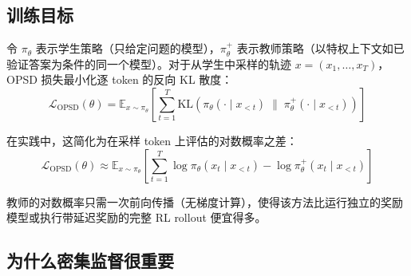 \subsection{训练目标}
\label{subsec:opsd-objective}

令 $\pi_\theta$ 表示学生策略（只给定问题的模型），$\pi_\theta^+$ 表示教师策略（以特权上下文如已验证答案为条件的同一个模型）。对于从学生中采样的轨迹 $x = (x_1, \ldots, x_T)$，OPSD 损失最小化逐 token 的反向 KL 散度：
\[
\mathcal{L}_{\text{OPSD}}(\theta) = \mathbb{E}_{x \sim \pi_\theta}\left[\sum_{t=1}^{T} \text{KL}\!\left(\pi_\theta(\cdot \mid x_{<t}) \;\|\; \pi_\theta^+(\cdot \mid x_{<t})\right)\right]
\]

在实践中，这简化为在采样 token 上评估的对数概率之差：
\[
\mathcal{L}_{\text{OPSD}}(\theta) \approx \mathbb{E}_{x \sim \pi_\theta}\left[\sum_{t=1}^{T} \log \pi_\theta(x_t \mid x_{<t}) - \log \pi_\theta^+(x_t \mid x_{<t})\right]
\]

教师的对数概率只需一次前向传播（无梯度计算），使得该方法比运行独立的奖励模型或执行带延迟奖励的完整 RL rollout 便宜得多。

\subsection{为什么密集监督很重要}
\label{subsec:opsd-dense}


